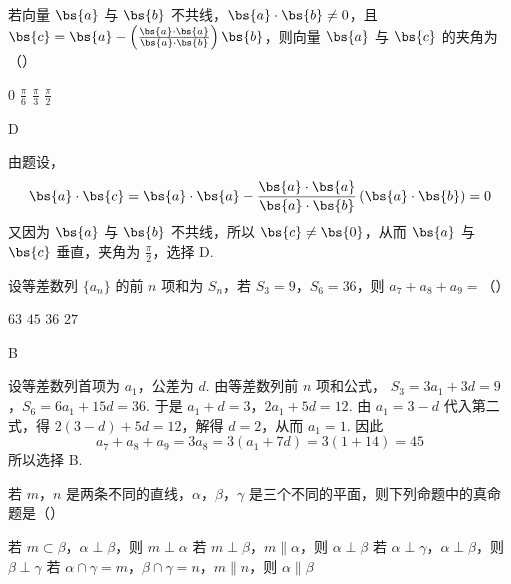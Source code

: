 \begin{problem}
若向量 \(\bs{a}\) 与 \(\bs{b}\) 不共线，\(\bs{a}\cdot\bs{b}\neq0\)，且 \(\bs{c}=\bs{a}-\left(\frac{\bs{a}\cdot\bs{a}}{\bs{a}\cdot\bs{b}}\right)\bs{b}\)，则向量 \(\bs{a}\) 与 \(\bs{c}\) 的夹角为（\quad）

\choices
    {\(0\)}
    {\(\frac{\pi}{6}\)}
    {\(\frac{\pi}{3}\)}
    {\(\frac{\pi}{2}\)}
\end{problem}

\begin{answer}
D
\end{answer}

\begin{solution}
由题设，
\[
\bs{a}\cdot\bs{c}=\bs{a}\cdot\bs{a}-\frac{\bs{a}\cdot\bs{a}}{\bs{a}\cdot\bs{b}}\left(\bs{a}\cdot\bs{b}\right)=0
\]
又因为 \(\bs{a}\) 与 \(\bs{b}\) 不共线，所以 \(\bs{c}\neq\bs{0}\)，从而 \(\bs{a}\) 与 \(\bs{c}\) 垂直，夹角为 \(\frac{\pi}{2}\)，选择 D.
\end{solution}

\begin{problem}
设等差数列 \(\{a_n\}\) 的前 \(n\) 项和为 \(S_n\)，若 \(S_3=9\)，\(S_6=36\)，则 \(a_7+a_8+a_9=\)（\quad）

\choices
    {\(63\)}
    {\(45\)}
    {\(36\)}
    {\(27\)}
\end{problem}

\begin{answer}
B
\end{answer}

\begin{solution}
设等差数列首项为 \(a_1\)，公差为 \(d\). 由等差数列前 \(n\) 项和公式，
\(S_3=3a_1+3d=9\)，\(S_6=6a_1+15d=36\).
于是 \(a_1+d=3\)，\(2a_1+5d=12\). 由 \(a_1=3-d\) 代入第二式，得
\(2(3-d)+5d=12\)，解得 \(d=2\)，从而 \(a_1=1\). 因此
\[
a_7+a_8+a_9=3a_8=3\left(a_1+7d\right)=3(1+14)=45
\]
所以选择 B.
\end{solution}

\begin{problem}
若 \(m\)，\(n\) 是两条不同的直线，\(\alpha\)，\(\beta\)，\(\gamma\) 是三个不同的平面，则下列命题中的真命题是（\quad）

\choices
    {若 \(m\subset\beta\)，\(\alpha\perp\beta\)，则 \(m\perp\alpha\)}
    {若 \(m\perp\beta\)，\(m\parallel\alpha\)，则 \(\alpha\perp\beta\)}
    {若 \(\alpha\perp\gamma\)，\(\alpha\perp\beta\)，则 \(\beta\perp\gamma\)}
    {若 \(\alpha\cap\gamma=m\)，\(\beta\cap\gamma=n\)，\(m\parallel n\)，则 \(\alpha\parallel\beta\)}
\end{problem}

